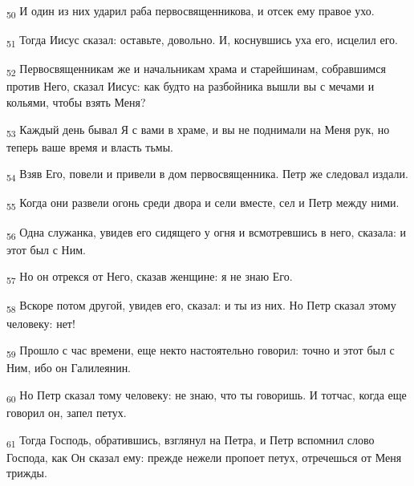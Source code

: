 \begin{tcolorbox}
\textsubscript{50} И один из них ударил раба первосвященникова, и отсек ему правое ухо.
\end{tcolorbox}
\begin{tcolorbox}
\textsubscript{51} Тогда Иисус сказал: оставьте, довольно. И, коснувшись уха его, исцелил его.
\end{tcolorbox}
\begin{tcolorbox}
\textsubscript{52} Первосвященникам же и начальникам храма и старейшинам, собравшимся против Него, сказал Иисус: как будто на разбойника вышли вы с мечами и кольями, чтобы взять Меня?
\end{tcolorbox}
\begin{tcolorbox}
\textsubscript{53} Каждый день бывал Я с вами в храме, и вы не поднимали на Меня рук, но теперь ваше время и власть тьмы.
\end{tcolorbox}
\begin{tcolorbox}
\textsubscript{54} Взяв Его, повели и привели в дом первосвященника. Петр же следовал издали.
\end{tcolorbox}
\begin{tcolorbox}
\textsubscript{55} Когда они развели огонь среди двора и сели вместе, сел и Петр между ними.
\end{tcolorbox}
\begin{tcolorbox}
\textsubscript{56} Одна служанка, увидев его сидящего у огня и всмотревшись в него, сказала: и этот был с Ним.
\end{tcolorbox}
\begin{tcolorbox}
\textsubscript{57} Но он отрекся от Него, сказав женщине: я не знаю Его.
\end{tcolorbox}
\begin{tcolorbox}
\textsubscript{58} Вскоре потом другой, увидев его, сказал: и ты из них. Но Петр сказал этому человеку: нет!
\end{tcolorbox}
\begin{tcolorbox}
\textsubscript{59} Прошло с час времени, еще некто настоятельно говорил: точно и этот был с Ним, ибо он Галилеянин.
\end{tcolorbox}
\begin{tcolorbox}
\textsubscript{60} Но Петр сказал тому человеку: не знаю, что ты говоришь. И тотчас, когда еще говорил он, запел петух.
\end{tcolorbox}
\begin{tcolorbox}
\textsubscript{61} Тогда Господь, обратившись, взглянул на Петра, и Петр вспомнил слово Господа, как Он сказал ему: прежде нежели пропоет петух, отречешься от Меня трижды.
\end{tcolorbox}

